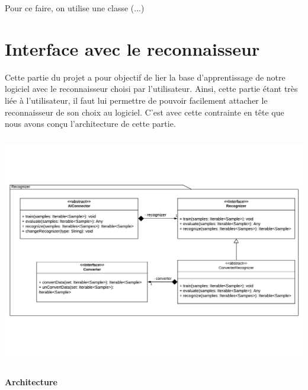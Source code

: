 Pour ce faire, on utilise une classe (...)

\section{Interface avec le reconnaisseur}

Cette partie du projet a pour objectif de lier la base d'apprentissage de notre logiciel avec le reconnaisseur choisi par l'utilisateur. Ainsi, cette partie étant très liée à l'utilisateur, il faut lui permettre de pouvoir facilement attacher le reconnaisseur de son choix au logiciel. C'est avec cette contrainte en tête que nous avons conçu l'architecture de cette partie.

\begin{mdframed}[frametitle={Architecture de l'interface avec le reconnaisseur}, innerbottommargin=10]
\begin{center}
\includegraphics[trim={0, 2cm, 0 , 7cm}, scale=0.55, height=100mm]{assets/UML_Recognizer.pdf}
\end{center}
\end{mdframed}

\paragraph{Architecture}

